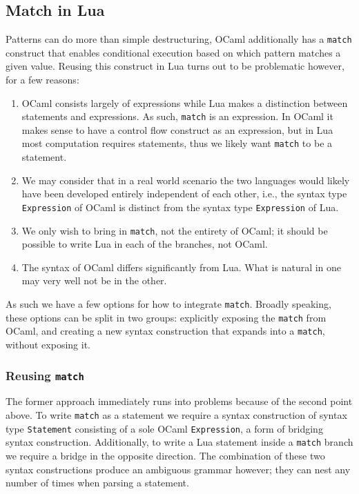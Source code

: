 \documentclass{kththesis}
\begin{document}
\subsection{Match in Lua} \label{sec:match-in-lua}

Patterns can do more than simple destructuring, OCaml additionally has a \texttt{match} construct that enables conditional execution based on which pattern matches a given value. Reusing this construct in Lua turns out to be problematic however, for a few reasons:

\begin{enumerate}
\item OCaml consists largely of expressions while Lua makes a distinction between statements and expressions. As such, \texttt{match} is an expression. In OCaml it makes sense to have a control flow construct as an expression, but in Lua most computation requires statements, thus we likely want \texttt{match} to be a statement.

\item We may consider that in a real world scenario the two languages would likely have been developed entirely independent of each other, i.e., the syntax type \texttt{Expression} of OCaml is distinct from the syntax type \texttt{Expression} of Lua.

\item We only wish to bring in \texttt{match}, not the entirety of OCaml; it should be possible to write Lua in each of the branches, not OCaml.

\item The syntax of OCaml differs significantly from Lua. What is natural in one may very well not be in the other.
\end{enumerate}

As such we have a few options for how to integrate \texttt{match}. Broadly speaking, these options can be split in two groups: explicitly exposing the \texttt{match} from OCaml, and creating a new syntax construction that expands into a \texttt{match}, without exposing it.

\subsubsection{Reusing \texttt{match}}

The former approach immediately runs into problems because of the second point above. To write \texttt{match} as a statement we require a syntax construction of syntax type \texttt{Statement} consisting of a sole OCaml \texttt{Expression}, a form of bridging syntax construction. Additionally, to write a Lua statement inside a \texttt{match} branch we require a bridge in the opposite direction. The combination of these two syntax constructions produce an ambiguous grammar however; they can nest any number of times when parsing a statement.
\end{document}
